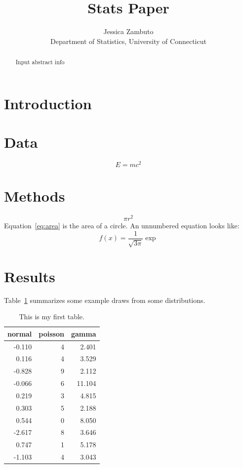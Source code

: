 \documentclass[12pt]{article}
\title{Stats Paper}
\author{Jessica Zambuto\\
Department of Statistics, University of Connecticut}
\begin{document}
\maketitle

\begin{abstract}
Input abstract info 	
\end{abstract}

\section{Introduction}
\label{sec:intro}

\lipsum[1-3]

\section{Data}
\label{sec:data}
\begin{equation}
  \label{eq:mc2}
  E= m c^2
\end{equation}


\section{Methods}
\label{sec:meth}
\begin{equation}
	\label{eq:area}
	\pi r^2
\end{equation}
Equation~\eqref{eq:area} is the area of a circle.
An unnumbered equation looks like:
\[
f(x)=\frac{1}{\sqrt{3\pi}}\exp
\]

\section{Results}
\label{sec:results}
Table~\ref{tab:rv} summarizes some example draws from some distributions.
\lipsum[1-4]

\begin{table}[ht]
  \caption{This is my first table.}
  \label{tab:rv}
\centering
\begin{tabular}{rrr}
  \toprule
normal & poisson & gamma \\ 
  \midrule
-0.110 & 4 & 2.401 \\ 
  0.116 & 4 & 3.529 \\ 
  -0.828 & 9 & 2.112 \\ 
  -0.066 & 6 & 11.104 \\ 
  0.219 & 3 & 4.815 \\ 
  0.303 & 5 & 2.188 \\ 
  0.544 & 0 & 8.050 \\ 
  -2.617 & 8 & 3.646 \\ 
  0.747 & 1 & 5.178 \\ 
  -1.103 & 4 & 3.043 \\ 
   \bottomrule
\end{tabular}
\end{table}
\end{document}
